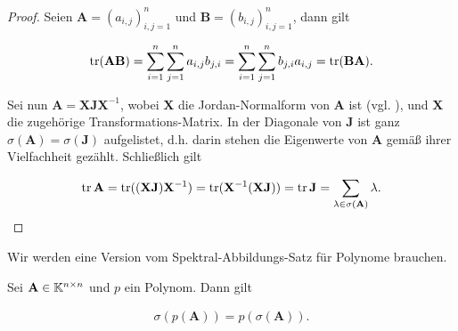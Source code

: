             \begin{proof}

                Seien $\mathbf A = (a_{i,j})_{i,j=1}^n$ und $\mathbf B = (b_{i,j})_{i,j=1}^n$, dann gilt

                \begin{align*}
                    \operatorname{tr}(\mathbf A \mathbf B)
                    =
                    \sum_{i=1}^n
                        \sum_{j=1}^n
                            a_{i,j} b_{j,i}
                    =
                    \sum_{i=1}^n
                        \sum_{j=1}^n
                            b_{j,i} a_{i,j}
                    =
                    \operatorname{tr}(\mathbf B \mathbf A).
                \end{align*}

                Sei nun $\mathbf A = \mathbf X \mathbf J \mathbf X^{-1}$, wobei $\mathbf X$ die Jordan-Normalform von $\mathbf A$ ist (vgl. \cite[Kapitel 8.7]{LinAG1&2}), und $\mathbf X$ die zugehörige Transformations-Matrix.
                In der Diagonale von $\mathbf J$ ist ganz $\sigma(\mathbf A) = \sigma(\mathbf J)$ aufgelistet, d.h. darin stehen die Eigenwerte von $\mathbf A$ gemäß ihrer Vielfachheit gezählt.
                Schließlich gilt

                \begin{align*}
                    \operatorname{tr} \mathbf A
                    =
                    \operatorname{tr}((\mathbf X \mathbf J) \mathbf X^{-1})
                    =
                    \operatorname{tr}(\mathbf X^{-1} (\mathbf X \mathbf J))
                    =
                    \operatorname{tr} \mathbf J
                    =
                    \sum_{\lambda \in \sigma(\mathbf A)} \lambda.
                \end{align*}

            \end{proof}

            Wir werden eine Version vom Spektral-Abbildungs-Satz für Polynome brauchen.

            \begin{theorem} \label{thm:spectral_mapping_theorem}

                Sei $\mathbf A \in \mathbb K^{n \times n}$ und $p$ ein Polynom.
                Dann gilt

                \begin{align*}
                    \sigma(p(\mathbf A))
                    =
                    p(\sigma(\mathbf A)).
                \end{align*}

            \end{theorem}

